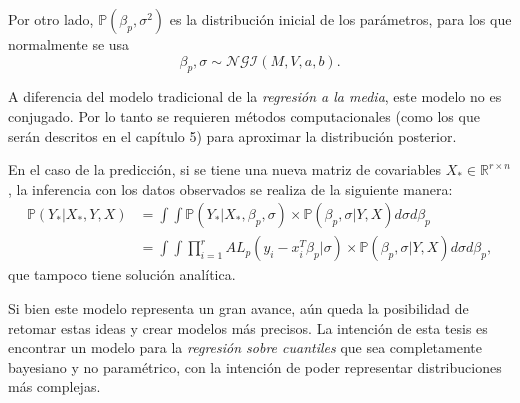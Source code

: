 Por otro lado, $\mathbb{P}(\beta_p,\sigma^2)$ es la distribuci\'on inicial de los par\'ametros, para los que normalmente se usa
\begin{equation*}
    \beta_p,\sigma \sim \mathcal{NGI}(M,V,a,b). 
\end{equation*}

A diferencia del modelo tradicional de la \textit{regresi\'on a la media}, este modelo no es conjugado. Por lo tanto se requieren m\'etodos computacionales (como los que ser\'an descritos en el cap\'itulo 5) para aproximar la distribuci\'on posterior.

En el caso de la predicci\'on, si se tiene una nueva matriz de covariables $X_* \in \mathbb{R}^{r \times n}$, la inferencia con los datos observados se realiza de la siguiente manera:
\begin{equation*}
\begin{aligned}
    \mathbb{P}(Y_*|X_*,Y,X)
    &= \int \int \mathbb{P}(Y_*|X_*,\beta_p,\sigma) \times \mathbb{P}(\beta_p,\sigma|Y,X) d\sigma d\beta_p \\
    &= \int \int \prod_{i=1}^r AL_p(y_i - x_i^T\beta_p|\sigma) \times \mathbb{P}(\beta_p,\sigma|Y,X) d\sigma d\beta_p,
\end{aligned}
\end{equation*}
que tampoco tiene soluci\'on anal\'itica.

Si bien este modelo representa un gran avance, a\'un queda la posibilidad de retomar estas ideas y crear modelos m\'as precisos. La intenci\'on de esta tesis es encontrar un modelo para la \textit{regresi\'on sobre cuantiles} que sea completamente bayesiano y no param\'etrico, con la intenci\'on de poder representar distribuciones m\'as complejas.
